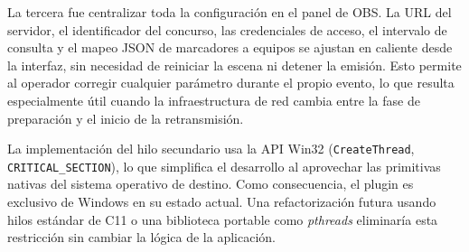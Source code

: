 La tercera fue centralizar toda la configuración en el panel de OBS. La URL del servidor, el
identificador del concurso, las credenciales de acceso, el intervalo de consulta y el mapeo
JSON de marcadores a equipos se ajustan en caliente desde la interfaz, sin necesidad de
reiniciar la escena ni detener la emisión. Esto permite al operador corregir cualquier parámetro
durante el propio evento, lo que resulta especialmente útil cuando la infraestructura de red
cambia entre la fase de preparación y el inicio de la retransmisión.
 
\begin{sloppypar}
La implementación del hilo secundario usa la API Win32 (\texttt{CreateThread},
\texttt{CRITICAL\_SECTION}), lo que simplifica el desarrollo al aprovechar las primitivas nativas
del sistema operativo de destino. Como consecuencia, el plugin es exclusivo de Windows en su
estado actual. Una refactorización futura usando hilos estándar de C11 o una biblioteca portable
como \textit{pthreads} eliminaría esta restricción sin cambiar la lógica de la aplicación.
\end{sloppypar}
